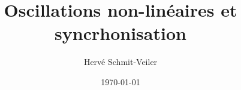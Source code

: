 



% 




    




    

    



% 

\documentclass{beamer}

\usepackage[utf8]{inputenc}
\usepackage{graphicx}
\usepackage{amsmath}
\usepackage{breqn} %

\usepackage[
            backend=biber,
            style=numeric,
            sorting=none,
            ]{biblatex}



\title{Oscillations non-linéaires et syncrhonisation}
\author{Hervé Schmit-Veiler}
\date{\today}



\frame{\titlepage}

\small

\begin{frame}{Plan}
  \tableofcontents
\end{frame}



